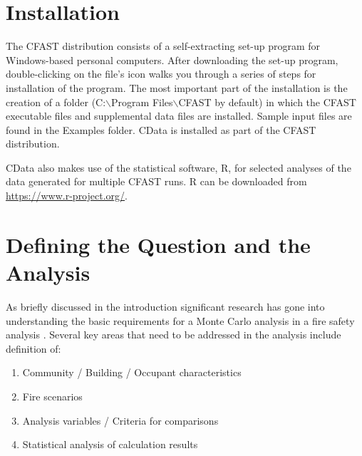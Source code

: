 \documentclass[12pt,twoside]{book}
\begin{document}
\section{Installation}

The CFAST distribution consists of a self-extracting set-up program for Windows-based personal computers. After downloading the set-up program, double-clicking on the file's icon walks you through a series of steps for installation of the program.  The most important part of the installation is the creation of a folder ({\ct C:$\backslash$Program Files$\backslash$CFAST} by default) in which the CFAST executable files and supplemental data files are installed.  Sample input files are found in the {\ct Examples} folder. CData is installed as part of the CFAST distribution.

CData also makes use of the statistical software, R, for selected analyses of the data generated for multiple CFAST runs. R can be downloaded from \url{https://www.r-project.org/}.

%
%

\section{Defining the Question and the Analysis}

As briefly discussed in the introduction significant research has gone into understanding the basic requirements for a Monte Carlo analysis in a fire safety analysis \cite{Bukowski_1985,Clarke_1990,NFPA_5000,Hurley_2016,bruns_tn_2016}. Several key areas that need to be addressed in the analysis include definition of:

\begin{enumerate}
  \item Community / Building / Occupant characteristics
  \item Fire scenarios
  \item Analysis variables / Criteria for comparisons
  \item Statistical analysis of calculation results
\end{enumerate}
\end{document}
